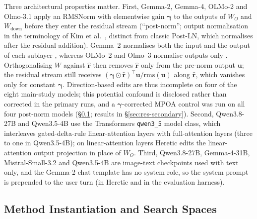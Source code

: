 Three architectural properties matter. First, Gemma-2, Gemma-4, OLMo-2 and
Olmo-3.1 apply an RMSNorm \cite{zhang2019rmsnorm} with elementwise gain
$\boldsymbol{\gamma}$ to the outputs of $W_O$ and $W_{\mathrm{down}}$ before
they enter the residual stream (``post-norm''; output normalisation in the
terminology of Kim et al.~\cite{kim2025periln}, distinct from classic Post-LN,
which normalises after the residual addition). Gemma~2 normalises both the
input and the output of each sublayer \cite{gemmateam2024gemma2}, whereas
OLMo~2 and Olmo~3 normalise outputs only \cite{walsh2025olmo2,olmo2025olmo3}. Orthogonalising $W$ against $\hat{\mathbf{r}}$ then removes
$\hat{\mathbf{r}}$ only from the pre-norm output $\mathbf{u}$; the residual
stream still receives
$(\boldsymbol{\gamma}\odot\hat{\mathbf{r}})^{\top}\mathbf{u}/\mathrm{rms}(\mathbf{u})$
along $\hat{\mathbf{r}}$, which vanishes only for constant
$\boldsymbol{\gamma}$. Direction-based edits are thus incomplete on four of the
eight main-study models; this potential confound is disclosed rather than
corrected in the primary runs, and a $\boldsymbol{\gamma}$-corrected MPOA
control was run on all four post-norm models (\S\ref{app:setup-methods};
results in \S\ref{sec:res-secondary}). Second, Qwen3.8-27B and Qwen3.5-4B use the
Transformers \texttt{qwen3\_5} model class, which interleaves gated-delta-rule
linear-attention layers \cite{yang2025gated} with full-attention layers (three to one in
Qwen3.5-4B); on linear-attention layers Heretic edits the linear-attention
output projection in place of $W_O$. Third, Qwen3.8-27B, Gemma-4-31B,
Mistral-Small-3.2 and Qwen3.5-4B are image-text checkpoints used with text
only, and the Gemma-2
chat template has no system role, so the system prompt is prepended to the
user turn (in Heretic and in the evaluation harness).

\subsection{Method Instantiation and Search Spaces}
\label{app:setup-methods}

